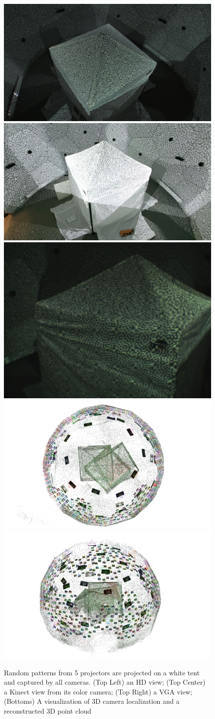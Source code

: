 \begin{figure}
	\centering
	\includegraphics[height=0.12\linewidth]{figures/calib_tent_hd}
	\includegraphics[height=0.12\linewidth]{figures/calib_tent_kinect}
	\includegraphics[height=0.12\linewidth]{figures/calib_tent_vga}\\
	\includegraphics[trim=50 0 50 0,clip,width=0.4\columnwidth]{figures/domeCalib/38}  
	\includegraphics[trim=50 0 50 0,clip,width=0.4\columnwidth]{figures/domeCalib/39}  
	\caption{Random patterns from 5 projectors are projected on a white tent and captured by all cameras. (Top Left) an HD view; (Top Center) a Kinect view from its color camera; (Top Right) a VGA view; (Bottoms) A visualization of 3D camera localization and a reconstructed 3D point cloud} 
	\label{fig:spatialCalibration}
\end{figure}
